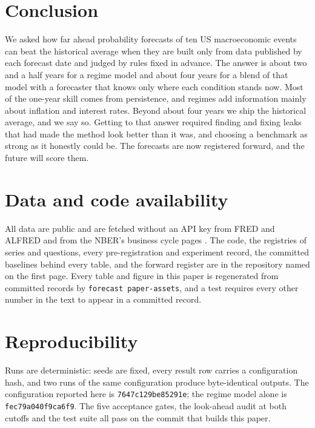 \documentclass[11pt]{article}
\begin{document}
\section{Conclusion}\label{sec:conclusion}

We asked how far ahead probability forecasts of ten US macroeconomic events can beat the historical
average when they are built only from data published by each forecast date and judged by rules fixed in
advance.
The answer is about two and a half years for a regime model and about four years for a blend of that
model with a forecaster that knows only where each condition stands now. Most of the one-year skill
comes from persistence, and regimes add information mainly about inflation and interest rates. Beyond
about four years we ship the historical average, and we say so. Getting to that answer required finding
and fixing leaks that had made the method look better than it was, and choosing a benchmark as strong as
it honestly could be. The forecasts are now registered forward, and the future will score them.

\section*{Data and code availability}

All data are public and are fetched without an API key from FRED and ALFRED
\citep{stlouisfed2026fred,stlouisfed2026alfred} and from the NBER's business cycle pages
\citep{nber2026cycles,nber2026announcements}. The code, the registries of series and questions, every
pre-registration and experiment record, the committed baselines behind every table, and the forward
register are in the repository named on the first page. Every table and figure in this paper is
regenerated from committed records by \texttt{forecast paper-assets}, and a test requires every other
number in the text to appear in a committed record.

\section*{Reproducibility}

Runs are deterministic: seeds are fixed, every result row carries a configuration hash, and two runs of
the same configuration produce byte-identical outputs. The configuration reported here is
\texttt{7647c129be85291e}; the regime model alone is \texttt{fec79a040f9ca6f9}. The five acceptance
gates, the look-ahead audit at both cutoffs and the test suite all pass on the commit that builds this
paper.
\end{document}
